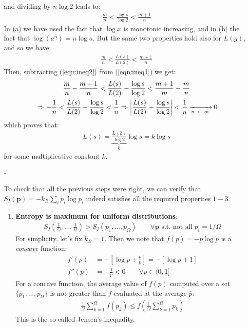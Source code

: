 \documentclass[../../main.tex]{subfiles}
\begin{document}
and dividing by $n \log 2$ leads to:
\begin{align}\label{eqn:ineq1}
    \frac{m}{n} < \frac{\log s}{\log 2} < \frac{m+1}{n}   
\end{align}
In (a) we have used the fact that $\log x$ is monotonic increasing, and in (b) the fact that $\log(a^n) = n \log a$. But the same two properties hold also for $L(g)$, and so we have:
\begin{align}\label{eqn:ineq2}
    \frac{m}{n} < \frac{L(s)}{L(2)} < \frac{m+1}{n}   
\end{align}
Then, subtracting (\ref{eqn:ineq2}) from (\ref{eqn:ineq1}) we get:
\begin{align*}
    \frac{m}{n} - \frac{m+1}{n} < \frac{L(s)}{L(2)} - \frac{\log s}{\log 2} < \frac{m+1}{m} - \frac{m}{n} \span \\
    \span \Rightarrow -\frac{1}{n} < \frac{L(s)}{L(2)} - \frac{\log s}{\log 2} < \frac{1}{n} \Rightarrow \left | \frac{L(s)}{L(2)} - \frac{\log s}{\log 2}   \right | < \frac{1}{n}  \xrightarrow[n \to +\infty]{} 0 
\end{align*}
which proves that:
\begin{align*}
    L(s) = \underbrace{\frac{L(2)}{\log 2}}_{k} \log s = k \log s  
\end{align*}
for some multiplicative constant $k$.
\begin{flushright}
    $\square$
\end{flushright}

To check that all the previous steps were right, we can verify that $S_I(\bm{p}) = -k_B \sum_i p_i \log p_i$ indeed satisfies all the required properties $1-3$.

\begin{enumerate}
    \item \textbf{Entropy is maximum for uniform distributions}:
    \begin{align*}
        S_I\left(\frac{1}{\Omega},\dots, \frac{1}{\Omega}  \right) > S_I(p_1, \dots, p_\Omega) \qquad \forall \bm{p} \text{ s.t. not all $p_i = 1/\Omega$} 
    \end{align*}
    For simplicity, let's fix $k_B = 1$. Then we note that $f(p) = - p \log p$ is a \textit{concave} function:
    \begin{align*}
        f'(p) &= -[\log p + \frac{p}{p} ] = -[\log p + 1]\\
        f''(p) &= - \frac{1}{p} < 0 \qquad \forall p \in (0,1] 
    \end{align*}
    For a concave function, the average value of $f(p)$ computed over a set $\{p_1,\dots,p_\Omega\}$ is not greater than $f$ evaluated at the average $\bar{p}$:
    \begin{align}\label{eqn:Jensen-ineq}
        \frac{1}{\Omega} \sum_{k=1}^\Omega f(p_k) \leq f\left(\frac{1}{\Omega} \sum_{k=1}^\Omega p_k \right) 
    \end{align}
    This is the so-called Jensen's inequality. %

\end{enumerate}
\end{document}
